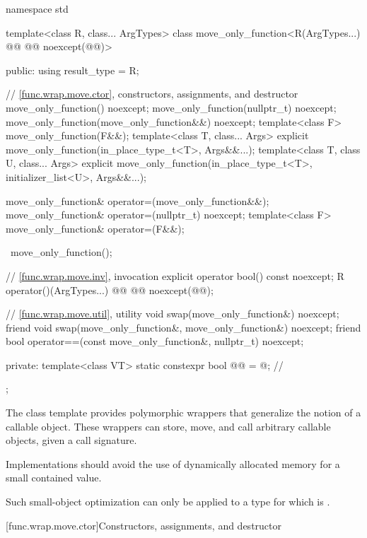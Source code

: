 %
\begin{codeblock}
namespace std {
  template<class R, class... ArgTypes>
  class move_only_function<R(ArgTypes...) @\cv{}@ @@ noexcept(@@)> {
  public:
    using result_type = R;

    // \ref{func.wrap.move.ctor}, constructors, assignments, and destructor
    move_only_function() noexcept;
    move_only_function(nullptr_t) noexcept;
    move_only_function(move_only_function&&) noexcept;
    template<class F> move_only_function(F&&);
    template<class T, class... Args>
      explicit move_only_function(in_place_type_t<T>, Args&&...);
    template<class T, class U, class... Args>
      explicit move_only_function(in_place_type_t<T>, initializer_list<U>, Args&&...);

    move_only_function& operator=(move_only_function&&);
    move_only_function& operator=(nullptr_t) noexcept;
    template<class F> move_only_function& operator=(F&&);

    ~move_only_function();

    // \ref{func.wrap.move.inv}, invocation
    explicit operator bool() const noexcept;
    R operator()(ArgTypes...) @\cv{}@ @@ noexcept(@@);

    // \ref{func.wrap.move.util}, utility
    void swap(move_only_function&) noexcept;
    friend void swap(move_only_function&, move_only_function&) noexcept;
    friend bool operator==(const move_only_function&, nullptr_t) noexcept;

  private:
    template<class VT>
      static constexpr bool @@ = @\seebelow@;       // \expos
  };
}
\end{codeblock}

\pnum
The  class template provides polymorphic wrappers
that generalize the notion of a callable object.
These wrappers can store, move, and call arbitrary callable objects,
given a call signature.

\pnum
\recommended
Implementations should avoid the use of dynamically allocated memory
for a small contained value.
\begin{note}
Such small-object optimization can only be applied to a type 
for which  is .
\end{note}

[func.wrap.move.ctor]{Constructors, assignments, and destructor}

